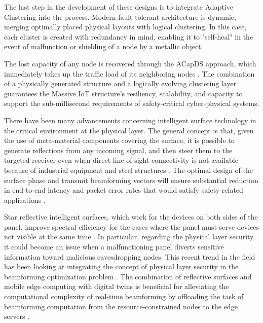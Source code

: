 \documentclass[a4paper,fleqn]{cas-dc}
\numberwithin{equation}{section}
\begin{document}
The last step in the development of these designs is to integrate Adaptive Clustering into the process. Modern fault-tolerant architecture is dynamic, merging optimally placed physical layouts with logical clustering. In this case, each cluster is created with redundancy in mind, enabling it to "self-heal" in the event of malfunction or shielding of a node by a metallic object.

The lost capacity of any node is recovered through the ACapDS approach, which immediately takes up the traffic load of its neighboring nodes \cite{b7, Arapoglu_2024_ACapDS}. The combination of a physically generated structure and a logically evolving clustering layer guarantees the Massive IoT structure's resiliency, scalability, and capacity to support the sub-millisecond requirements of safety-critical cyber-physical systems.

There have been many advancements concerning intelligent surface technology in the critical environment at the physical layer. The general concept is that, given the use of meta-material components covering the surface, it is possible to generate reflections from any incoming signal, and then steer them to the targeted receiver even when direct line-of-sight connectivity is not available because of industrial equipment and steel structures \cite{b4}. The optimal design of the surface phase and transmit beamforming vectors will ensure substantial reduction in end-to-end latency and packet error rates that would satisfy safety-related applications \cite{Wu_2024_RIS_Reliability, Soleymani_2024_RIS_URLLC, Soleymani_2025_RSMA}.

Star reflective intelligent surfaces, which work for the devices on both sides of the panel, improve spectral efficiency for the cases where the panel must serve devices not visible at the same time \cite{Tahir_2024_STAR_RIS, Zhao_2024_DigitalTwin}. In particular, regarding the physical layer security, it could become an issue when a malfunctioning panel diverts sensitive information toward malicious eavesdropping nodes. This recent trend in the field has been looking at integrating the concept of physical layer security in the beamforming optimization problem \cite{Chen_2024_RIS_Security, Navarro_2024_StochasticBeamforming}. The combination of reflective surfaces and mobile edge computing with digital twins is beneficial for alleviating the computational complexity of real-time beamforming by offloading the task of beamforming computation from the resource-constrained nodes to the edge servers \cite{Antoniewicz_2024_Bandwidth, Mao_2024_Edge_Offloading}.
\end{document}
